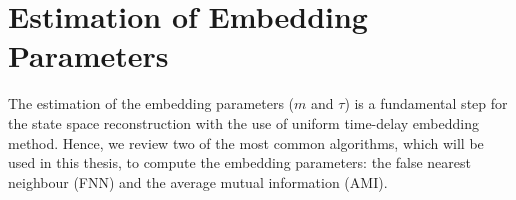 \section{Estimation of Embedding Parameters}
The estimation of the embedding parameters ($m$ and $\tau$) 
is a fundamental step for the state space reconstruction with the use
of uniform time-delay embedding method.
Hence, we review two of the most common algorithms,
which will be used in this thesis, to compute the embedding
parameters: the false nearest neighbour (FNN) and the average mutual information (AMI).


